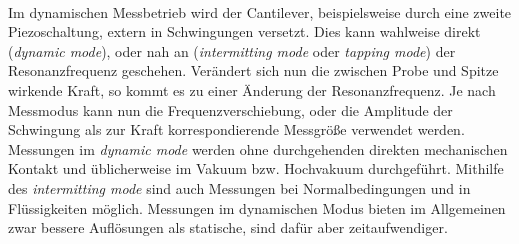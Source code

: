 \\
Im dynamischen Messbetrieb wird der Cantilever, beispielsweise durch eine zweite Piezoschaltung, extern in Schwingungen versetzt. Dies kann wahlweise direkt (\textit{dynamic mode}), oder nah an (\textit{intermitting mode} oder \textit{tapping mode}) der Resonanzfrequenz geschehen. Verändert sich nun die zwischen Probe und Spitze wirkende Kraft, so kommt es zu einer Änderung der Resonanzfrequenz. Je nach Messmodus kann nun die Frequenzverschiebung, oder die Amplitude der Schwingung als zur Kraft korrespondierende Messgröße verwendet werden. Messungen im \textit{dynamic mode} werden ohne durchgehenden direkten mechanischen Kontakt und üblicherweise im Vakuum bzw. Hochvakuum durchgeführt. Mithilfe des \textit{intermitting mode} sind auch Messungen bei Normalbedingungen und in Flüssigkeiten möglich.
Messungen im dynamischen Modus bieten im Allgemeinen zwar bessere Auflösungen als statische, sind dafür aber zeitaufwendiger.

